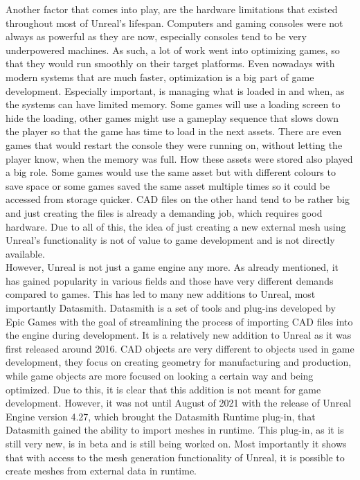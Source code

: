 Another factor that comes into play, are the hardware limitations that existed throughout most of Unreal's lifespan. Computers and gaming consoles were not always as powerful as they are now, especially consoles tend to be very underpowered machines. As such, a lot of work went into optimizing games, so that they would run smoothly on their target platforms. Even nowadays with modern systems that are much faster, optimization is a big part of game development. Especially important, is managing what is loaded in and when, as the systems can have limited memory. Some games will use a loading screen to hide the loading, other games might use a gameplay sequence that slows down the player so that the game has time to load in the next assets. There are even games that would restart the console they were running on, without letting the player know, when the memory was full\cite{bib:Morrowind}. How these assets were stored also played a big role. Some games would use the same asset but with different colours to save space or some games saved the same asset multiple times so it could be accessed from storage quicker. \acs{CAD} files on the other hand tend to be rather big and just creating the files is already a demanding job, which requires good hardware. Due to all of this, the idea of just creating a new external mesh using Unreal's functionality is not of value to game development and is not directly available.\\
However, Unreal is not just a game engine any more. As already mentioned, it has gained popularity in various fields and those have very different demands compared to games. This has led to many new additions to Unreal, most importantly Datasmith. Datasmith is a set of tools and plug-ins developed by Epic Games with the goal of streamlining the process of importing \acs{CAD} files into the engine during development\cite{bib:DSDoc}. It is a relatively new addition to Unreal as it was first released around 2016. \acs{CAD} objects are very different to objects used in game development, they focus on creating geometry for manufacturing and production, while game objects are more focused on looking a certain way and being optimized. Due to this, it is clear that this addition is not meant for game development. However, it was not until August of 2021 with the release of Unreal Engine version 4.27, which brought the Datasmith Runtime plug-in, that Datasmith gained the ability to import meshes in runtime\cite{bib:DSRunDoc}. This plug-in, as it is still very new, is in beta and is still being worked on. Most importantly it shows that with access to the mesh generation functionality of Unreal, it is possible to create meshes from external data in runtime.\\ 

